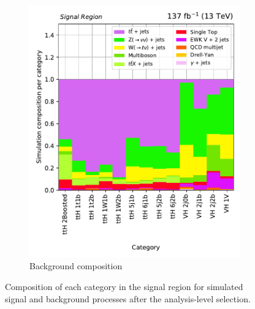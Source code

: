 \begin{figure}[htbp]
\begin{subfigure}[b]{0.49\textwidth}
        \includegraphics[width=\textwidth]{figures/region_plots/full_Run2/region_0/background_composition.pdf}
        \caption{Background composition}
    \end{subfigure}
    \caption[Composition of each category in the signal region for simulated signal and background processes after the analysis-level selection]{Composition of each category in the signal region for simulated signal and background processes after the analysis-level selection.}
    \label{fig:htoinv_sr_composition_comb2016to18}
\end{figure}
